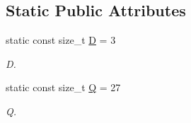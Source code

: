 \subsection*{Static Public Attributes}
\begin{DoxyCompactItemize}
\item 
\hypertarget{classnatrium_1_1D3Q27_a70ac295cb0d619520d3f9d1cc062a8f9}{
static const size\_\-t \hyperlink{classnatrium_1_1D3Q27_a70ac295cb0d619520d3f9d1cc062a8f9}{D} = 3}
\label{classnatrium_1_1D3Q27_a70ac295cb0d619520d3f9d1cc062a8f9}

\begin{DoxyCompactList}\small\item\em D. \item\end{DoxyCompactList}\item 
\hypertarget{classnatrium_1_1D3Q27_ad15f9c712c68bd3457bdf3560fd25226}{
static const size\_\-t \hyperlink{classnatrium_1_1D3Q27_ad15f9c712c68bd3457bdf3560fd25226}{Q} = 27}
\label{classnatrium_1_1D3Q27_ad15f9c712c68bd3457bdf3560fd25226}

\begin{DoxyCompactList}\small\item\em Q. \item\end{DoxyCompactList}\end{DoxyCompactItemize}

